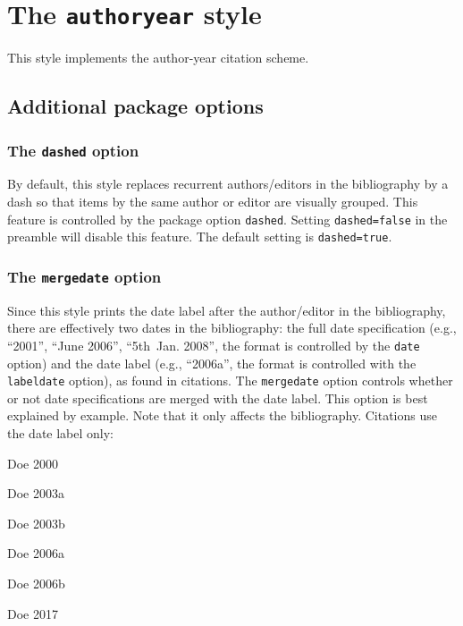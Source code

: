 \documentclass[a4paper]{article}
\newenvironment{bibsample}
  {\trivlist\samepage
   \setlength{\itemsep}{0pt}}
  {\endtrivlist}
\begin{document}
\section*{The \texttt{authoryear} style}

This style implements the author-year citation scheme.

\subsection*{Additional package options}

\subsubsection*{The \texttt{dashed} option}

By default, this style replaces recurrent authors/editors in the
bibliography by a dash so that items by the same author or editor
are visually grouped. This feature is controlled by the package
option \texttt{dashed}. Setting \texttt{dashed=false} in the
preamble will disable this feature. The default setting is
\texttt{dashed=true}.

\subsubsection*{The \texttt{mergedate} option}

Since this style prints the date label after the author/editor in the
bibliography, there are effectively two dates in the bibliography:
the full date specification (e.g., \enquote{2001}, \enquote{June
2006}, \enquote{5th~Jan. 2008}, the format is controlled by the
\texttt{date} option) and the date label (e.g., \enquote{2006a},
the format is controlled with the \texttt{labeldate} option),
as found in citations. The \texttt{mergedate} option controls whether
or not date specifications are merged with the date label.
This option is best explained by example. Note that
it only affects the bibliography. Citations use the date label only:

\begin{bibsample}
\item Doe 2000
\item Doe 2003a
\item Doe 2003b
\item Doe 2006a
\item Doe 2006b
\item Doe 2017
\end{bibsample}
\end{document}
